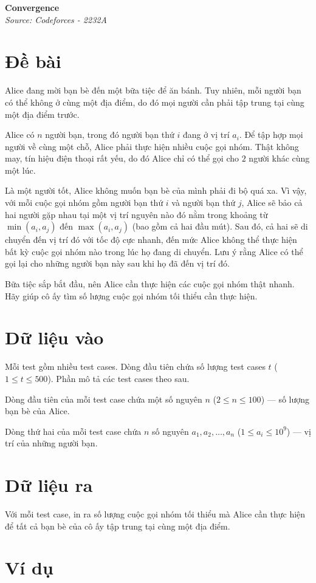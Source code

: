 \documentclass[11pt]{article}
\newcommand{\problem}[2]{
    \begin{problembox}
    \begin{center}
        \Large \textbf{#1} \\
        \vspace{0.2cm}
        \small \textit{Source: #2}
    \end{center}
    \end{problembox}
}
\begin{document}
\newpage
\problem{Convergence}{Codeforces - 2232A}

\section*{Đề bài}
Alice đang mời bạn bè đến một bữa tiệc để ăn bánh. Tuy nhiên, mỗi người bạn có thể không ở cùng một địa điểm, do đó mọi người cần phải tập trung tại cùng một địa điểm trước.

Alice có $n$ người bạn, trong đó người bạn thứ $i$ đang ở vị trí $a_i$. Để tập hợp mọi người về cùng một chỗ, Alice phải thực hiện nhiều cuộc gọi nhóm. Thật không may, tín hiệu điện thoại rất yếu, do đó Alice chỉ có thể gọi cho $2$ người khác cùng một lúc.

Là một người tốt, Alice không muốn bạn bè của mình phải đi bộ quá xa. Vì vậy, với mỗi cuộc gọi nhóm gồm người bạn thứ $i$ và người bạn thứ $j$, Alice sẽ bảo cả hai người gặp nhau tại một vị trí nguyên nào đó nằm trong khoảng từ $\min(a_i, a_j)$ đến $\max(a_i, a_j)$ (bao gồm cả hai đầu mút). Sau đó, cả hai sẽ di chuyển đến vị trí đó với tốc độ cực nhanh, đến mức Alice không thể thực hiện bất kỳ cuộc gọi nhóm nào trong lúc họ đang di chuyển. Lưu ý rằng Alice có thể gọi lại cho những người bạn này sau khi họ đã đến vị trí đó.

Bữa tiệc sắp bắt đầu, nên Alice cần thực hiện các cuộc gọi nhóm thật nhanh. Hãy giúp cô ấy tìm số lượng cuộc gọi nhóm tối thiểu cần thực hiện.

\section*{Dữ liệu vào}
Mỗi test gồm nhiều test cases. Dòng đầu tiên chứa số lượng test cases $t$ ($1 \le t \le 500$). Phần mô tả các test cases theo sau.

Dòng đầu tiên của mỗi test case chứa một số nguyên $n$ ($2 \le n \le 100$) — số lượng bạn bè của Alice.

Dòng thứ hai của mỗi test case chứa $n$ số nguyên $a_1, a_2, \ldots, a_n$ ($1 \le a_i \le 10^9$) — vị trí của những người bạn.

\section*{Dữ liệu ra}
Với mỗi test case, in ra số lượng cuộc gọi nhóm tối thiểu mà Alice cần thực hiện để tất cả bạn bè của cô ấy tập trung tại cùng một địa điểm.

\section*{Ví dụ}
\begin{example}
\begin{exmp}
\end{exmp}
\end{example}
\end{document}
